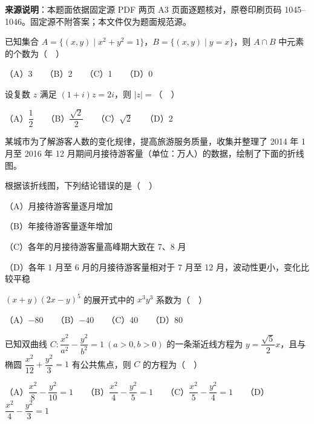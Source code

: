 


\begin{gktip}
\textbf{来源说明}：本题面依据固定源 PDF 两页 A3 页面逐题核对，原卷印刷页码 1045–1046。固定源不附答案；本文件仅为题面规范源。
\end{gktip}


\begin{question}
已知集合 \(A=\{(x,y)\mid x^2+y^2=1\}\)，\(B=\{(x,y)\mid y=x\}\)，则 \(A\cap B\) 中元素的个数为（　）

   （A）3　　（B）2　　（C）1　　（D）0

\end{question}
\begin{question}
设复数 \(z\) 满足 \((1+i)z=2i\)，则 \(|z|=\)（　）

   （A）\(\dfrac12\)　　（B）\(\dfrac{\sqrt2}{2}\)　　（C）\(\sqrt2\)　　（D）2

\Needspace{0.4\textheight}
\end{question}
\begin{question}
某城市为了解游客人数的变化规律，提高旅游服务质量，收集并整理了 2014 年 1 月至 2016 年 12 月期间月接待游客量（单位：万人）的数据，绘制了下面的折线图。
\nopagebreak[4]
\begin{center}\end{center}
\nopagebreak[4]
   根据该折线图，下列结论错误的是（　）

   （A）月接待游客量逐月增加

   （B）年接待游客量逐年增加

   （C）各年的月接待游客量高峰期大致在 7、8 月

   （D）各年 1 月至 6 月的月接待游客量相对于 7 月至 12 月，波动性更小，变化比较平稳

\end{question}
\begin{question}
\((x+y)(2x-y)^5\) 的展开式中的 \(x^3y^3\) 系数为（　）

   （A）\(-80\)　　（B）\(-40\)　　（C）40　　（D）80

\end{question}
\begin{question}
已知双曲线 \(C:\dfrac{x^2}{a^2}-\dfrac{y^2}{b^2}=1\ (a>0,b>0)\) 的一条渐近线方程为 \(y=\dfrac{\sqrt5}{2}x\)，且与椭圆 \(\dfrac{x^2}{12}+\dfrac{y^2}{3}=1\) 有公共焦点，则 \(C\) 的方程为（　）

   （A）\(\dfrac{x^2}{8}-\dfrac{y^2}{10}=1\)　　（B）\(\dfrac{x^2}{4}-\dfrac{y^2}{5}=1\)　　（C）\(\dfrac{x^2}{5}-\dfrac{y^2}{4}=1\)　　（D）\(\dfrac{x^2}{4}-\dfrac{y^2}{3}=1\)

\end{question}
